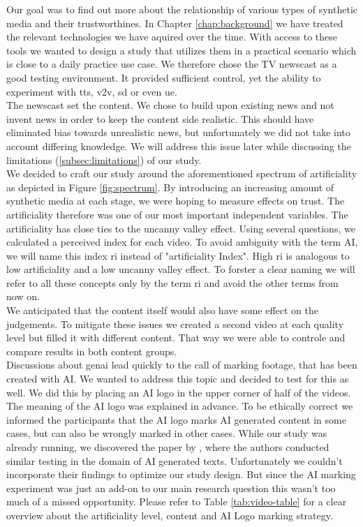 \documentclass[
  a4paper,  %
  twoside,  %
  bibliography=totoc,
  headsepline,
  cleardoublepage=empty,
  parskip=half,
  draft=false
]{scrbook}
\begin{document}
Our goal was to find out more about the relationship of various types of synthetic media and their trustworthines. In Chapter \ref{chap:background} we have treated the relevant technologies we have aquired over the time. With access to these tools we wanted to design a study that utilizes them in a practical scenario which is close to a daily practice use case. We therefore chose the TV newscast as a good testing environment. It provided sufficient control, yet the ability to experiment with \gls{tts}, \gls{v2v}, \gls{sd} or even \gls{ue}. \\
The newscast set the content. We chose to build upon existing news and not invent news in order to keep the content side realistic. This should have eliminated bias towards unrealistic news, but unfortunately we did not take into account differing knowledge. We will address this issue later while discussing the limitations (\ref{subsec:limitations}) of our study. \\
We decided to craft our study around the aforementioned spectrum of artificiality as depicted in Figure \ref{fig:spectrum}. By introducing an increasing amount of synthetic media at each stage, we were hoping to measure effects on trust. The artificiality therefore was one of our most important independent variables. The artificiality has close ties to the uncanny valley effect. Using several questions, we calculated a perceived index for each video. To avoid ambiguity with the term AI, we will name this index \gls{ri} instead of "artificiality Index". High \gls{ri} is analogous to low artificiality and a low uncanny valley effect. To forster a clear naming we will refer to all these concepts only by the term \gls{ri} and avoid the other terms from now on.\\
We anticipated that the content itself would also have some effect on the judgements. To mitigate these issues we created a second video at each quality level but filled it with different content. That way we were able to controle and compare results in both content groups. \\
Discussions about \gls{genai} lead quickly to the call of marking footage, that has been created with AI. We wanted to address this topic and decided to test for this as well. We did this by placing an AI logo in the upper corner of half of the videos. The meaning of the AI logo was explained in advance. To be ethically correct we informed the participants that the AI logo marks AI generated content in some cases, but can also be wrongly marked in other cases. While our study was already running, we discovered the paper by \citeauthor{toffTheyCouldJust2023}, where the authors conducted similar testing in the domain of AI generated texts. Unfortunately we couldn't incorporate their findings to optimize our study design. But since the AI marking experiment was just an add-on to our main research question this wasn't too much of a missed opportunity. Please refer to Table \ref{tab:video-table} for a clear overview about the artificiality level, content and AI Logo marking strategy.
\end{document}
